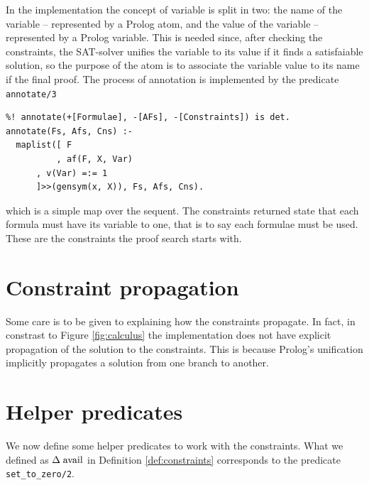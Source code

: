 \documentclass[a4paper, 12pt, tesi, english]{report}
\begin{document}
In the implementation the concept of variable is split in two: the name of the variable -- represented by a Prolog atom, and the value of the variable -- represented by a Prolog variable.
This is needed since, after checking the constraints, the SAT-solver unifies the variable to its value if it finds a satisfaiable solution, so the purpose of the atom is to associate the variable value to its name if the final proof.
The process of annotation is implemented by the predicate \texttt{annotate/3}
\begin{verbatim}
%! annotate(+[Formulae], -[AFs], -[Constraints]) is det.
annotate(Fs, Afs, Cns) :-
  maplist([ F
          , af(F, X, Var)
	  , v(Var) =:= 1
	  ]>>(gensym(x, X)), Fs, Afs, Cns).
\end{verbatim}
which is a simple map over the sequent.
The constraints returned state that each formula must have its variable to one, that is to say each formulae must be used.
These are the constraints the proof search starts with.

\section{Constraint propagation}
Some care is to be given to explaining how the constraints propagate.
In fact, in constrast to Figure \ref{fig:calculus} the implementation does not have explicit propagation of the solution to the constraints.
This is because Prolog's unification implicitly propagates a solution from one branch to another.

\section{Helper predicates}\label{sec:helper}
We now define some helper predicates to work with the constraints.
What we defined as $\Delta \; \text{avail}$ in Definition \ref{def:constraints} corresponds to the predicate \texttt{set\_to\_zero/2}.
\end{document}
